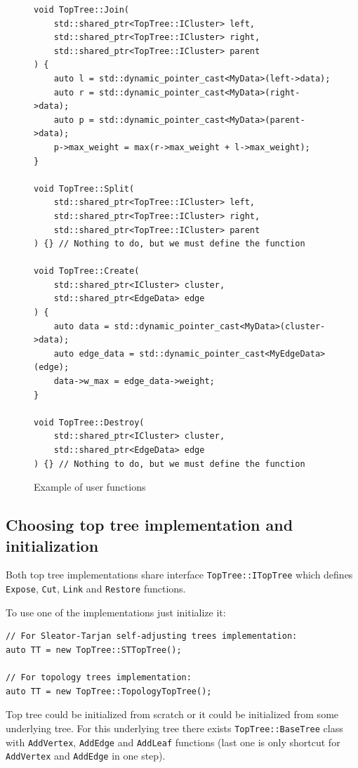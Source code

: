 \begin{figure}[H]
\begin{verbatim}
void TopTree::Join(
    std::shared_ptr<TopTree::ICluster> left,
    std::shared_ptr<TopTree::ICluster> right,
    std::shared_ptr<TopTree::ICluster> parent
) {
    auto l = std::dynamic_pointer_cast<MyData>(left->data);
    auto r = std::dynamic_pointer_cast<MyData>(right->data);
    auto p = std::dynamic_pointer_cast<MyData>(parent->data);
    p->max_weight = max(r->max_weight + l->max_weight);
}

void TopTree::Split(
    std::shared_ptr<TopTree::ICluster> left,
    std::shared_ptr<TopTree::ICluster> right,
    std::shared_ptr<TopTree::ICluster> parent
) {} // Nothing to do, but we must define the function

void TopTree::Create(
    std::shared_ptr<ICluster> cluster,
    std::shared_ptr<EdgeData> edge
) {
    auto data = std::dynamic_pointer_cast<MyData>(cluster->data);
    auto edge_data = std::dynamic_pointer_cast<MyEdgeData>(edge);
    data->w_max = edge_data->weight;
}

void TopTree::Destroy(
    std::shared_ptr<ICluster> cluster,
    std::shared_ptr<EdgeData> edge
) {} // Nothing to do, but we must define the function
\end{verbatim}
\caption{Example of user functions}
\end{figure}

\subsection{Choosing top tree implementation and initialization}

Both top tree implementations share interface \texttt{TopTree::ITopTree} which
defines \texttt{Expose}, \texttt{Cut}, \texttt{Link} and \texttt{Restore}
functions.

To use one of the implementations just initialize it:
\begin{verbatim}
// For Sleator-Tarjan self-adjusting trees implementation:
auto TT = new TopTree::STTopTree();

// For topology trees implementation:
auto TT = new TopTree::TopologyTopTree();
\end{verbatim}

Top tree could be initialized from scratch or it could be initialized from
some underlying tree. For this underlying tree there exists
\texttt{TopTree::BaseTree} class with \texttt{AddVertex}, \texttt{AddEdge}
and \texttt{AddLeaf} functions (last one is only shortcut for \texttt{AddVertex}
and \texttt{AddEdge} in one step).

